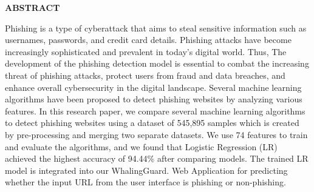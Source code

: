 




\begin{center}
\textbf{\LARGE{ABSTRACT}}\\[1cm]

\end{center}
\normalsize
\hspace{1cm}Phishing is a type of cyberattack that aims to steal sensitive information such as usernames, passwords, and credit card details. Phishing attacks have become increasingly sophisticated and prevalent in today’s digital world. Thus, The development of the phishing detection model is essential to combat the increasing threat of phishing attacks, protect users from fraud and data breaches, and enhance overall cybersecurity in the digital landscape. Several machine learning algorithms have been proposed to detect phishing websites by analyzing various features. In this research paper, we compare several machine learning algorithms to detect phishing websites using a dataset of 545,895 samples which is created by pre-processing and merging two separate datasets. We use 74 features to train and evaluate the algorithms, and we found that Logistic Regression (LR) achieved the highest accuracy of 94.44\% after comparing models. The trained LR model is integrated into our WhalingGuard. Web Application for predicting whether the input URL from the user interface is phishing or non-phishing.





